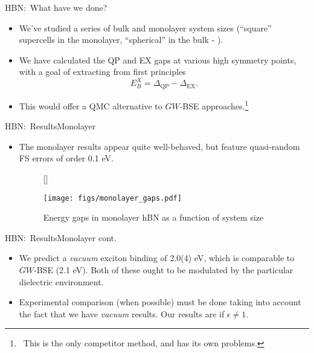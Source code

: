 \documentclass[12pt, pdf, hyperref={draft}, usenames, dvipsnames,
aspectratio=169]{beamer}
\newcommand{\blue}[1]{{\bf\color{NavyBlue}{#1}}}
\begin{document}
\begin{frame}{HBN:\ What have we done?}
\begin{itemize}
  \item We've studied a series of bulk and monolayer system sizes (``square''
  supercells in the monolayer, ``spherical'' in the bulk - \blue{maximal WS
  radius}).
  \item We have calculated the QP and EX gaps at various high symmetry points,
  with a goal of extracting \blue{exciton binding energies} from first
  principles
  \begin{equation}
    E^{X}_{B} = \Delta_{\text{QP}} - \Delta_{\text{EX}}.
  \end{equation}
  \item This would offer a QMC alternative to $GW$-BSE
  approaches.\footnote{\ This is the only competitor method, and has its
  own problems.}
\end{itemize}
\end{frame}


\begin{frame}{HBN:\ Results}{Monolayer}
\begin{itemize}
  \item The monolayer results appear quite well-behaved, but feature
  quasi-random FS errors of order 0.1 eV.
\begin{figure}[H]
  [\FBwidth]
  {\caption{Energy gaps in monolayer hBN as a function of system
  size}\label{fig:monolayer_gaps}}
  {\texttt{[image: figs/monolayer\_gaps.pdf]}}
\end{figure}
\end{itemize}
\end{frame}


\begin{frame}{HBN:\ Results}{Monolayer cont.}
\begin{itemize}
  \item We predict a \textit{vacuum} exciton binding of 2.0(4) eV, which is
  comparable to $GW$-BSE (2.1 eV). Both of these ought
  to be modulated by the particular dielectric environment.
  \item Experimental comparison (when possible) must be done taking into
  account the fact that we have \textit{vacuum} results. Our results are
  \blue{renormalised strongly} if $\epsilon \neq 1$.
\end{itemize}
\end{frame}
\end{document}
